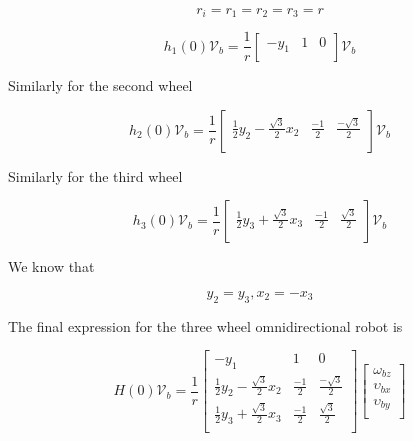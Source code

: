\documentclass{article}
\begin{document}
\begin{equation}
    r_i = r_1 = r_2 = r_3 = r
\end{equation}

\begin{equation}
    h_1(0) \mathcal{V}_b = \frac{1}{r}
    \begin{bmatrix}
        -y_1 & 1 & 0 \\
    \end{bmatrix}
    \mathcal{V}_b
\end{equation}


Similarly for the second wheel

\begin{equation}
    h_2(0) \mathcal{V}_b = \frac{1}{r}
    \begin{bmatrix}
        \frac{1}{2}y_2 - \frac{\sqrt{3}}{2}x_2 & \frac{-1}{2} & \frac{- \sqrt{3}}{2} \\
    \end{bmatrix}
    \mathcal{V}_b
\end{equation}


Similarly for the third wheel

\begin{equation}
    h_3(0) \mathcal{V}_b = \frac{1}{r}
    \begin{bmatrix}
        \frac{1}{2}y_3 + \frac{\sqrt{3}}{2}x_3 & \frac{-1}{2} & \frac{ \sqrt{3}}{2} \\
    \end{bmatrix}
    \mathcal{V}_b
\end{equation}


We know that

\begin{equation}
    y_2 = y_3,  x_2 = -x_3
\end{equation}

The final expression for the three wheel omnidirectional robot is

\begin{equation}
    H(0)\mathcal{V}_b = \frac{1}{r}
    \begin{bmatrix}
        -y_1                                   & 1            & 0                    \\
        \frac{1}{2}y_2 - \frac{\sqrt{3}}{2}x_2 & \frac{-1}{2} & \frac{- \sqrt{3}}{2} \\
        \frac{1}{2}y_3 + \frac{\sqrt{3}}{2}x_3 & \frac{-1}{2} & \frac{ \sqrt{3}}{2}  \\
    \end{bmatrix}
    \begin{bmatrix}
        \omega_{bz}   \\
        \upsilon_{bx} \\
        \upsilon_{by} \\
    \end{bmatrix}
\end{equation}
\end{document}
